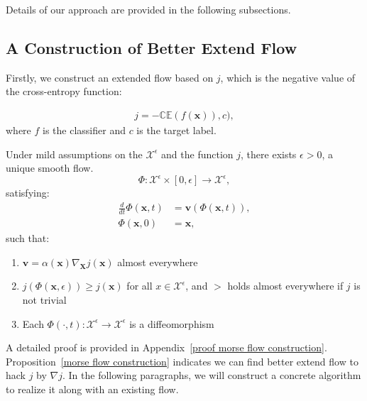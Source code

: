 Details of our approach are provided in the following subsections.
\subsection{A Construction of Better Extend Flow}

Firstly, we construct an extended flow based on $j$, which is the negative value of the cross-entropy function: 

\begin{equation}
\begin{split}
    j = -\mathbb{CE}(f(\mathbf{x})), c),
\end{split}
\label{eq:target}
\end{equation}
where $f$ is the classifier and $c$ is the target label.
\begin{proposition}
\label{morse flow construction}
    Under mild assumptions on the $\mathcal{X}^\epsilon$ and the function $j$, there exists $\epsilon > 0$, a unique smooth flow.
    \begin{equation}
        \Phi: \mathcal{X}^\epsilon \times [0, \epsilon] \to \mathcal{X}^\epsilon,
    \end{equation}
satisfying:
\begin{equation}
\begin{aligned}
\frac{d}{dt} \Phi(\mathbf{x}, t) &= \mathbf{v}(\Phi(\mathbf{x},t)), \\
\Phi(\mathbf{x}, 0) &= \mathbf{x},
\end{aligned}
\end{equation}
such that:
\begin{enumerate}
\item $\mathbf{v} = \alpha(\mathbf{x})\nabla_\mathbf{\mathbf{X}}j(\mathbf{x})$ almost everywhere
\item \( j(\Phi(\mathbf{x},\epsilon)) \geq j(\mathbf{x}) \) for all \( x \in \mathcal{X}^\epsilon \), and $>$ holds almost everywhere if $j$ is not trivial
\item Each \( \Phi(\cdot, t): \mathcal{X}^\epsilon \to \mathcal{X}^\epsilon \) is a diffeomorphism
\end{enumerate}
\end{proposition}

A detailed proof is provided in Appendix~\ref{proof morse flow construction}. Proposition~\ref{morse flow construction} indicates we can find better extend flow to hack $j$ by $\nabla j$. In the following paragraphs, we will construct a concrete algorithm to realize it along with an existing flow.

